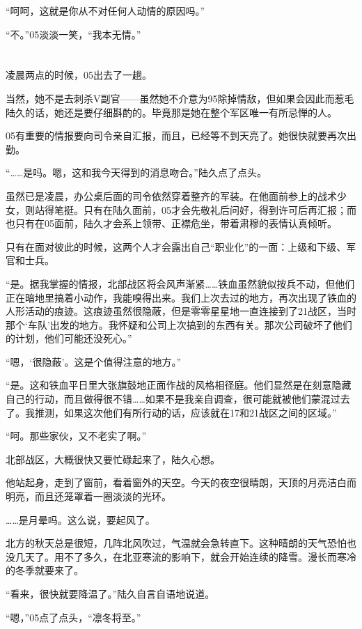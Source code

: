 “呵呵，这就是你从不对任何人动情的原因吗。”

“不。”05淡淡一笑，“我本无情。”



\section*{}

凌晨两点的时候，05出去了一趟。

当然，她不是去刺杀V副官——虽然她不介意为95除掉情敌，但如果会因此而惹毛陆久的话，她还是要仔细斟酌的。毕竟那是她在整个军区唯一有所忌惮的人。

05有重要的情报要向司令亲自汇报，而且，已经等不到天亮了。她很快就要再次出勤。

“……是吗。嗯，这和我今天得到的消息吻合。”陆久点了点头。

虽然已是凌晨，办公桌后面的司令依然穿着整齐的军装。在他面前参上的战术少女，则站得笔挺。只有在陆久面前，05才会先敬礼后问好，得到许可后再汇报；而也只有在05面前，陆久才会系上领带、正襟危坐，带着肃穆的表情认真倾听。

只有在面对彼此的时候，这两个人才会露出自己“职业化”的一面：上级和下级、军官和士兵。

“是。据我掌握的情报，北部战区将会风声渐紧……铁血虽然貌似按兵不动，但他们正在暗地里搞着小动作，我能嗅得出来。我们上次去过的地方，再次出现了铁血的人形活动的痕迹。这痕迹虽然很隐蔽，但是零零星星地一直连接到了21战区，当时那个‘车队’出发的地方。我怀疑和公司上次搞到的东西有关。那次公司破坏了他们的计划，他们可能还没死心。”

“嗯，‘很隐蔽’。这是个值得注意的地方。”

“是。这和铁血平日里大张旗鼓地正面作战的风格相径庭。他们显然是在刻意隐藏自己的行动，而且做得很不错……如果不是我亲自调查，很可能就被他们蒙混过去了。我推测，如果这次他们有所行动的话，应该就在17和21战区之间的区域。”

“呵。那些家伙，又不老实了啊。” 

北部战区，大概很快又要忙碌起来了，陆久心想。

他站起身，走到了窗前，看着窗外的天空。今天的夜空很晴朗，天顶的月亮洁白而明亮，而且还笼罩着一圈淡淡的光环。

……是月晕吗。这么说，要起风了。

北方的秋天总是很短，几阵北风吹过，气温就会急转直下。这种晴朗的天气恐怕也没几天了。用不了多久，在北亚寒流的影响下，就会开始连续的降雪。漫长而寒冷的冬季就要来了。

“看来，很快就要降温了。”陆久自言自语地说道。

“嗯，”05点了点头，“凛冬将至。”
